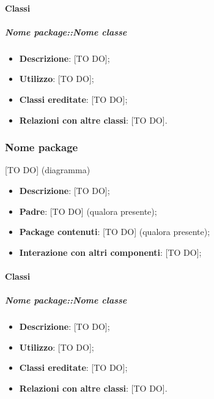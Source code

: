 		\paragraph{Classi} %
			\subparagraph{Nome package::Nome classe} %
			\label{subp:subparagraph_name}
				\begin{itemize}
					\item \textbf{Descrizione}: [TO DO];
					\item \textbf{Utilizzo}: [TO DO];
					\item \textbf{Classi ereditate}: [TO DO];
					\item \textbf{Relazioni con altre classi}: [TO DO].
				\end{itemize}




	\subsubsection{Nome package} %
	\label{ssub:nome_del_package}
	[TO DO] (diagramma) \newline \newline

	\begin{itemize}
		\item \textbf{Descrizione}: [TO DO];
		\item \textbf{Padre}: [TO DO] (qualora presente);
		\item \textbf{Package contenuti}: [TO DO] (qualora presente);
		\item \textbf{Interazione con altri componenti}: [TO DO];
	\end{itemize}

		\paragraph{Classi} %
			\subparagraph{Nome package::Nome classe} %
			\label{subp:subparagraph_name}
				\begin{itemize}
					\item \textbf{Descrizione}: [TO DO];
					\item \textbf{Utilizzo}: [TO DO];
					\item \textbf{Classi ereditate}: [TO DO];
					\item \textbf{Relazioni con altre classi}: [TO DO].
				\end{itemize}



